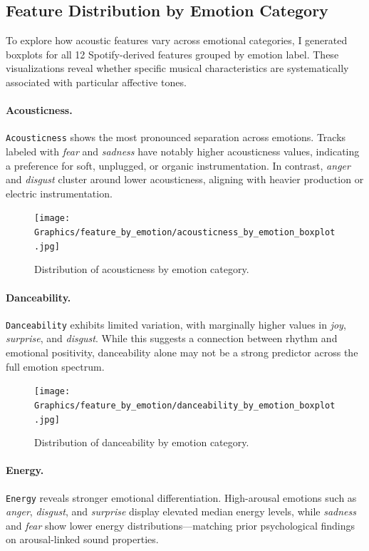 \documentclass{article}
\begin{document}
\subsection{Feature Distribution by Emotion Category}

To explore how acoustic features vary across emotional categories, I generated boxplots for all 12 Spotify-derived features grouped by emotion label. These visualizations reveal whether specific musical characteristics are systematically associated with particular affective tones.

\paragraph{Acousticness.} 
\texttt{Acousticness} shows the most pronounced separation across emotions. Tracks labeled with \textit{fear} and \textit{sadness} have notably higher acousticness values, indicating a preference for soft, unplugged, or organic instrumentation. In contrast, \textit{anger} and \textit{disgust} cluster around lower acousticness, aligning with heavier production or electric instrumentation.

\begin{figure}[H]
\centering
\texttt{[image: Graphics/feature\_by\_emotion/acousticness\_by\_emotion\_boxplot.jpg]}
\caption{Distribution of acousticness by emotion category.}
\label{fig:acousticness}
\end{figure}

\paragraph{Danceability.} 
\texttt{Danceability} exhibits limited variation, with marginally higher values in \textit{joy}, \textit{surprise}, and \textit{disgust}. While this suggests a connection between rhythm and emotional positivity, danceability alone may not be a strong predictor across the full emotion spectrum.

\begin{figure}[H]
\centering
\texttt{[image: Graphics/feature\_by\_emotion/danceability\_by\_emotion\_boxplot.jpg]}
\caption{Distribution of danceability by emotion category.}
\label{fig:danceability}
\end{figure}

\paragraph{Energy.} 
\texttt{Energy} reveals stronger emotional differentiation. High-arousal emotions such as \textit{anger}, \textit{disgust}, and \textit{surprise} display elevated median energy levels, while \textit{sadness} and \textit{fear} show lower energy distributions—matching prior psychological findings on arousal-linked sound properties.
\end{document}

